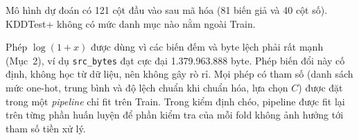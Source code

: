 \begin{table}[H]
\centering
\caption{Các bước chuẩn bị biến cho hồi quy Logistic}
\label{tab:t4:prep}
\small
\setlength{\tabcolsep}{3pt}
\par\smallskip\footnotesize Mô hình dự đoán có 121 cột đầu vào sau mã hóa (81 biến giả và 40 cột số). KDDTest+ không có mức danh mục nào nằm ngoài Train.
\end{table}

Phép $\log(1+x)$ được dùng vì các biến đếm và byte lệch phải rất mạnh (Mục~2), ví dụ \texttt{src\_bytes} đạt cực đại 1.379.963.888 byte. Phép biến đổi này cố định, không học từ dữ liệu, nên không gây rò rỉ. Mọi phép có tham số (danh sách mức one-hot, trung bình và độ lệch chuẩn khi chuẩn hóa, lựa chọn $C$) được đặt trong một \emph{pipeline} chỉ fit trên Train. Trong kiểm định chéo, pipeline được fit lại trên từng phần huấn luyện để phần kiểm tra của mỗi fold không ảnh hưởng tới tham số tiền xử lý.

